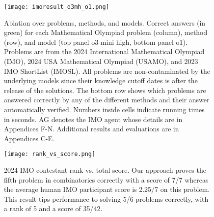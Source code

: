 \begin{figure}[t!]
  \centering
  \texttt{[image: imoresult\_o3mh\_o1.png]}
  \caption{Ablation over problems, methods, and models. Correct answers (in green) for each Mathematical Olympiad problem (column), method (row), and model (top panel o3-mini high, bottom panel o1). Problems are from the 2024 International Mathematical Olympiad (IMO), 2024 USA Mathematical Olympiad (USAMO), and 2023 IMO ShortList (IMOSL). All problems are non-contaminated by the underlying models since their knowledge cutoff dates is after the release of the solutions. The bottom row shows which problems are answered correctly by any of the different methods and their answer automatically verified. Numbers inside cells indicate running times in seconds. AG denotes the IMO agent whose details are in Appendices F-N. Additional results and evaluations are in Appendices C-E.}
  \label{fig:imo}
\end{figure}

\begin{figure}[b!]
  \centering
  \texttt{[image: rank\_vs\_score.png]}
  \caption{2024 IMO contestant rank vs. total score. Our approach proves the fifth problem in combinatorics correctly with a score of 7/7 whereas the average human IMO participant score is 2.25/7 on this problem. This result tips performance to solving 5/6 problems correctly, with a rank of 5 and a score of 35/42.}
  \label{fig:imo_gold}
\end{figure}

